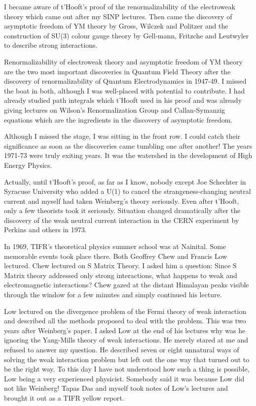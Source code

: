 I became aware of t'Hooft's proof of the renormalizability of the 
electroweak theory which came out after my SINP lectures. Then came the 
discovery of asymptotic freedom of YM theory by Gross, Wilczek and 
Politzer and the construction of SU(3) colour gauge theory by Gell-mann, 
Fritzche and Leutwyler to describe strong interactions.

Renormalizability of electroweak theory and asymptotic fre\-edom of YM 
theory are the two most important discoveries in Quantum Field Theory 
after the discovery of renormalizability of Quantum Electrodynamics in 
1947-49. I missed the boat in both, although I was well-placed with 
potential to contribute. I had already studied path integrals which 
t'Hooft used in his proof and was already giving lectures on Wilson's 
Renormalization Group and Callan-Symanzig equations which are the 
ingredients in the discovery of asymptotic freedom.

Although I missed the stage, I was sitting in the front row. I could 
catch their significance as soon as the discoveries came tumbling one 
after another! The years 1971-73 were truly exi\-ting years. It was the 
watershed in the development of High Ene\-rgy Physics.
  
Actually, until t'Hooft's proof, as far as I know, nobody except Joe 
Schechter in Syracuse University who added a U(1) to cancel the 
strangeness-changing neutral current and myself had taken Weinberg's 
theory seriously. Even after t'Hooft, only a few theorists took it 
seriously. Situation changed dramatically after the discovery of the 
weak neutral current interaction in the CERN experiment by Perkins and 
others in 1973.

In 1969, TIFR's theoretical physics summer school was at Nai\-nital. Some 
memorable events took place there. Both Geo\-ffrey Chew and Francis Low 
lectured. Chew lectured on S Matrix Theory. I asked him a question: 
Since S Matrix theory addressed only strong interactions, what happens 
to weak and electromagnetic interactions? Chew gazed at the distant 
Himalayan peaks visible through the window for a few minutes and simply 
continued his lecture.

Low lectured on the divergence problem of the Fermi theory of weak 
interaction and described all the methods proposed to deal with the 
problem. This was two years after Weinberg's paper. I asked Low at the 
end of his lectures why was he ignoring the Yang-Mills theory of weak 
interactions. He merely stared at me and refused to answer my question. 
He described seven or eight unnatural ways of solving the weak 
interaction problem but left out the one way that turned out to be the 
right way. To this day I have not understood how such a thing is 
possible, Low being a very experienced physicist. Somebody said it was 
because Low did not like Weinberg! Tapas Das and myself took notes of 
Low's lectures and brought it out as a TIFR yellow report.


